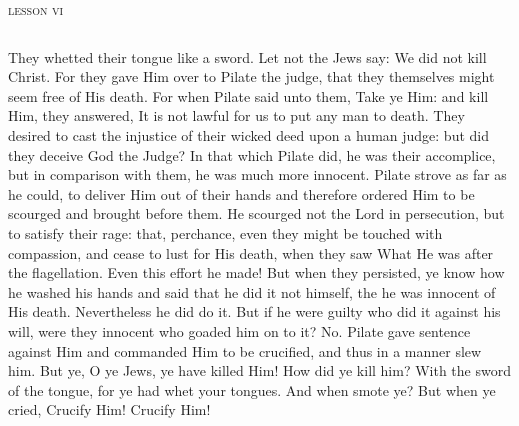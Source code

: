 \begin{center}{\textsc{lesson vi}}\end{center}

\begin{columns}
{They whetted their tongue like a sword. Let not the Jews say: We did not kill Christ. For they gave Him over to Pilate the judge, that they themselves might seem free of His death. For when Pilate said unto them, Take ye Him: and kill Him, they answered, It is not lawful for us to put any man to death. They desired to cast the injustice of their wicked deed upon a human judge: but did they deceive God the Judge? In that which Pilate did, he was their accomplice, but in comparison with them, he was much more innocent. Pilate strove as far as he could, to deliver Him out of their hands and therefore ordered Him to be scourged and brought before them. He scourged not the Lord in persecution, but to satisfy their rage: that, perchance, even they might be touched with compassion, and cease to lust for His death, when they saw What He was after the flagellation. Even this effort he made! But when they persisted, ye know how he washed his hands and said that he did it not himself, the he was innocent of His death. Nevertheless he did do it. But if he were guilty who did it against his will, were they innocent who goaded him on to it? No. Pilate gave sentence against Him and commanded Him to be crucified, and thus in a manner slew him. But ye, O ye Jews, ye have killed Him! How did ye kill him? With the sword of the tongue, for ye had whet your tongues. And when smote ye? But when ye cried, Crucify Him! Crucify Him!}
\end{columns}

